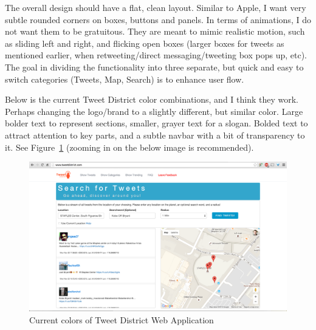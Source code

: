 \documentclass[11pt]{article}
\begin{document}
The overall design should have a flat, clean layout. Similar to Apple, I want very subtle rounded corners on boxes, buttons and panels. In terms of animations, I do not want them to be gratuitous. They are meant to mimic realistic motion, such as sliding left and right, and flicking open boxes (larger boxes for tweets as mentioned earlier, when retweeting/direct messaging/tweeting box pops up, etc). The goal in dividing the functionality into three separate, but quick and easy to switch categories (Tweets, Map, Search) is to enhance user flow.

Below is the current Tweet District color combinations, and I think they work. Perhaps changing the logo/brand to a slightly different, but similar color. Large bolder text to represent sections, smaller, grayer text for a slogan. Bolded text to attract attention to key parts, and a subtle navbar with a bit of transparency to it. See Figure~\ref{fig:currentPalette} (zooming in on the below image is recommended).


\begin{figure}[H]
    \centering
    \includegraphics[width=15cm]{currentPaletteSample}
    \caption{Current colors of Tweet District Web Application}
    \label{fig:currentPalette}
\end{figure}
\end{document}
